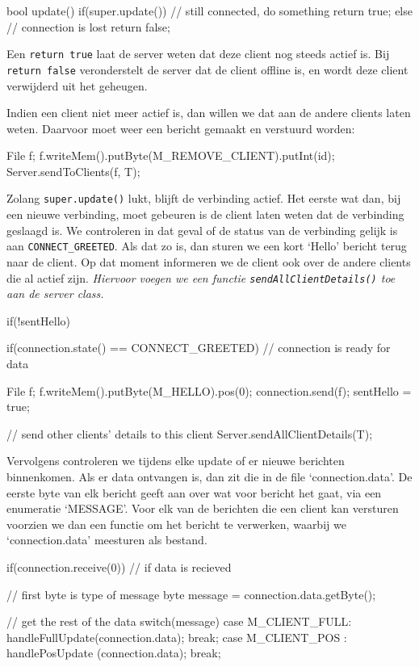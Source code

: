 \begin{code}
bool update() 
{
  if(super.update()) {
	  // still connected, do something
		return true;
	} else {
	  // connection is lost
		return false;
	}
}
\end{code}

Een \texttt{return true} laat de server weten dat deze client nog steeds actief is. Bij \texttt{return false} veronderstelt de server dat de client offline is, en wordt deze client verwijderd uit het geheugen.
	
Indien een client niet meer actief is, dan willen we dat aan de andere clients laten weten. Daarvoor moet weer een bericht gemaakt en verstuurd worden:
\begin{code}
File f;
f.writeMem().putByte(M_REMOVE_CLIENT).putInt(id);
Server.sendToClients(f, T);
\end{code}

Zolang \texttt{super.update()} lukt, blijft de verbinding actief. Het eerste wat dan, bij een nieuwe verbinding, moet gebeuren is de client laten weten dat de verbinding geslaagd is. We controleren in dat geval of de status van de verbinding gelijk is aan \texttt{CONNECT\_GREETED}. Als dat zo is, dan sturen we een kort `Hello' bericht terug naar de client. Op dat moment informeren we de client ook over de andere clients die al actief zijn. \textsl{Hiervoor voegen we een functie \texttt{sendAllClientDetails()} toe aan de server class.}

\begin{code}
if(!sentHello)
{
	if(connection.state() == CONNECT_GREETED) // connection is ready for data
	{
		 File f;
		 f.writeMem().putByte(M_HELLO).pos(0);
		 connection.send(f);
		 sentHello = true;
		 
		 // send other clients' details to this client
		 Server.sendAllClientDetails(T);
	}
}
\end{code}

Vervolgens controleren we tijdens elke update of er nieuwe berichten binnenkomen. Als er data ontvangen is, dan zit die in de file `connection.data'. De eerste byte van elk bericht geeft aan over wat voor bericht het gaat, via een enumeratie `MESSAGE'. Voor elk van de berichten die een client kan versturen voorzien we dan een functie om het bericht te verwerken, waarbij we `connection.data' meesturen als bestand.

\begin{code}
if(connection.receive(0)) // if data is recieved
{
	// first byte is type of message
	byte message = connection.data.getByte();
	
	// get the rest of the data
	switch(message)
	{
		 case M_CLIENT_FULL: handleFullUpdate(connection.data); break;
		 case M_CLIENT_POS : handlePosUpdate (connection.data); break;
	}
}
\end{code}

